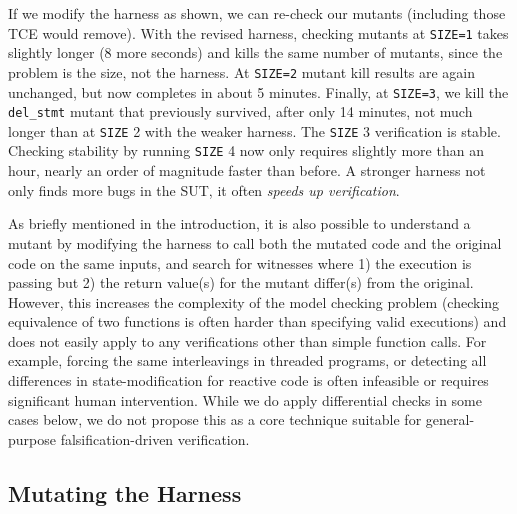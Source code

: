 \documentclass[conference]{IEEEtran}
\begin{document}
If we modify the harness as shown, we can re-check our mutants
(including those TCE would remove).  With the revised harness,
checking mutants at {\tt SIZE=1} takes slightly longer (8 more
seconds) and kills the same number of mutants, since the problem is
the size, not the harness.  At {\tt SIZE=2} mutant kill results are
again unchanged, but now completes in about 5 minutes.  Finally, at
{\tt SIZE=3}, we kill the {\tt del\_stmt} mutant that previously
survived, after only 14 minutes, not much longer than at {\tt SIZE} 2
with the weaker harness.  The {\tt SIZE} 3 verification is stable.
Checking stability by running {\tt SIZE} 4 now only requires slightly
more than an hour, nearly an order of magnitude faster than before.  A stronger harness not only finds more bugs in the
SUT, it often \emph{speeds up verification}.


As briefly mentioned in the introduction, it is also possible to
understand a mutant by modifying the harness to call both the mutated
code and the original code on the same inputs, and search for
witnesses where 1) the execution is passing but 2) the return value(s)
for the mutant differ(s) from the original.  However, this
increases the complexity of the model checking problem (checking
equivalence of two functions is often harder than
specifying valid executions) and does not easily apply to any
verifications other than simple function calls.  For example, forcing
the same interleavings in threaded programs, or detecting all
differences in state-modification for reactive code is often
infeasible or requires significant human intervention.  While we do
apply differential checks in some cases below, we do not propose this
as a core technique suitable for general-purpose falsification-driven
verification.

\subsection{Mutating the Harness}
\label{sec:checkharness}
\end{document}
